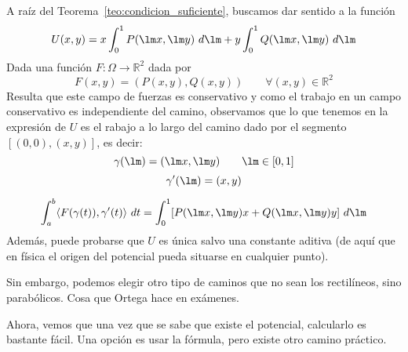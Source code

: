 A raíz del Teorema~\ref{teo:condicion_suficiente}, buscamos dar sentido a la función
\begin{equation*}
    U(x,y) = x\int_{0}^{1} P(\lm x,\lm y)~d\lm +y\int_{0}^{1} Q(\lm x,\lm y)~d\lm 
\end{equation*}
Dada una función $F:\Omega\rightarrow\mathbb{R}^2$ dada por
\begin{equation*}
    F(x,y) = (P(x,y),Q(x,y)) \qquad \forall (x,y)\in \mathbb{R}^2
\end{equation*}
Resulta que este campo de fuerzas es conservativo y como el trabajo en un campo conservativo es independiente del camino, observamos que lo que tenemos en la expresión de $U$ es el rabajo a lo largo del camino dado por el segmento $[(0,0),(x,y)]$, es decir:
\begin{equation*}
    \gamma(\lm) = (\lm x, \lm y) \qquad \lm \in [0,1]
\end{equation*}
\begin{equation*}
    \gamma'(\lm) = (x,y)
\end{equation*}

\begin{equation*}
    \int_{a}^{b} \langle F(\gamma(t)),\gamma'(t) \rangle~dt = \int_{0}^{1} [P(\lm x,\lm y)x + Q(\lm x,\lm y)y]~d\lm 
\end{equation*}
Además, puede probarse que $U$ es única salvo una constante aditiva (de aquí que en física el origen del potencial pueda situarse en cualquier punto).

Sin embargo, podemos elegir otro tipo de caminos que no sean los rectilíneos, sino parabólicos. Cosa que Ortega hace en exámenes.


Ahora, vemos que una vez que se sabe que existe el potencial, calcularlo es bastante fácil. Una opción es usar la fórmula, pero existe otro camino práctico.

